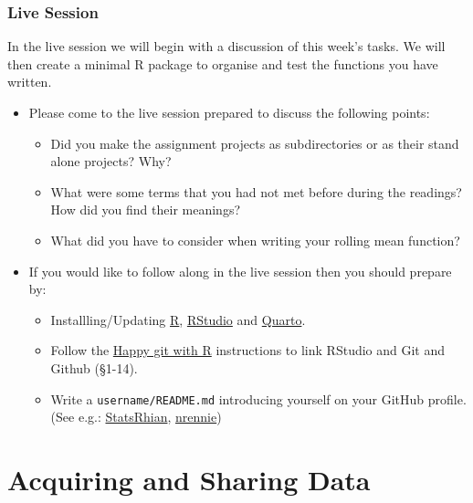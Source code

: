 \documentclass[
  letterpaper,
  DIV=11,
  numbers=noendperiod]{scrreprt}
\begin{document}
\section*{Live Session}\label{live-session}


In the live session we will begin with a discussion of this week's
tasks. We will then create a minimal R package to organise and test the
functions you have written.

\begin{itemize}
\item
  Please come to the live session prepared to discuss the following
  points:

  \begin{itemize}
  \item
    Did you make the assignment projects as subdirectories or as their
    stand alone projects? Why?
  \item
    What were some terms that you had not met before during the
    readings? How did you find their meanings?
  \item
    What did you have to consider when writing your rolling mean
    function?
  \end{itemize}
\item
  If you would like to follow along in the live session then you should
  prepare by:

  \begin{itemize}
  \item
    Installling/Updating \href{https://cran.r-project.org/}{R},
    \href{https://posit.co/download/rstudio-desktop/}{RStudio} and
    \href{https://quarto.org/}{Quarto}.
  \item
    Follow the \href{https://happygitwithr.com/}{Happy git with R}
    instructions to link RStudio and Git and Github (§1-14).
  \item
    Write a \texttt{username/README.md} introducing yourself on your
    GitHub profile. (See e.g.:
    \href{https://github.com/StatsRhian/StatsRhian}{StatsRhian},
    \href{https://github.com/nrennie/nrennie}{nrennie})
  \end{itemize}
\end{itemize}

\part{Acquiring and Sharing Data}
\end{document}
